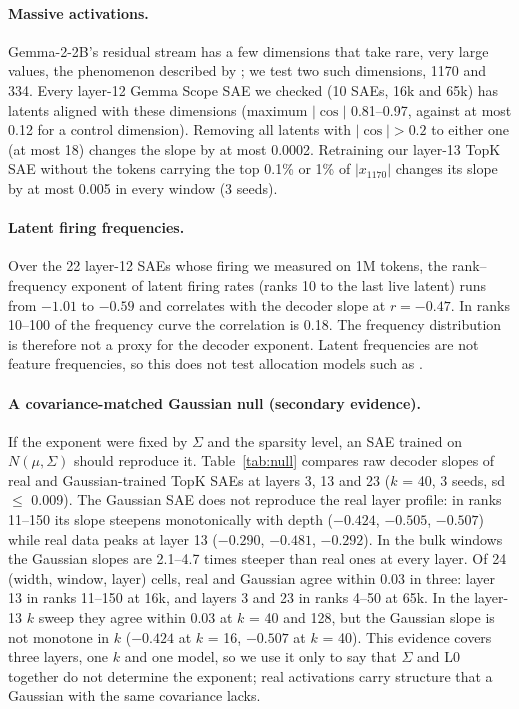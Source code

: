 \documentclass[10pt,twocolumn]{article}
\begin{document}
\paragraph{Massive activations.} Gemma-2-2B's residual stream has a few dimensions that take rare, very large values, the phenomenon described by \citet{sun2024massive}; we test two such dimensions, 1170 and 334. Every layer-12 Gemma Scope SAE we checked (10 SAEs, 16k and 65k) has latents aligned with these dimensions (maximum $|\cos|$ 0.81--0.97, against at most 0.12 for a control dimension). Removing all latents with $|\cos| > 0.2$ to either one (at most 18) changes the slope by at most 0.0002. Retraining our layer-13 TopK SAE without the tokens carrying the top 0.1\% or 1\% of $|x_{1170}|$ changes its slope by at most 0.005 in every window (3 seeds).

\paragraph{Latent firing frequencies.} Over the 22 layer-12 SAEs whose firing we measured on 1M tokens, the rank--frequency exponent of latent firing rates (ranks 10 to the last live latent) runs from $-1.01$ to $-0.59$ and correlates with the decoder slope at $r = -0.47$. In ranks 10--100 of the frequency curve the correlation is 0.18. The frequency distribution is therefore not a proxy for the decoder exponent. Latent frequencies are not feature frequencies, so this does not test allocation models such as \citet{michaud2025manifolds}.

\paragraph{A covariance-matched Gaussian null (secondary evidence).} If the exponent were fixed by $\Sigma$ and the sparsity level, an SAE trained on $N(\mu,\Sigma)$ should reproduce it. Table~\ref{tab:null} compares raw decoder slopes of real and Gaussian-trained TopK SAEs at layers 3, 13 and 23 ($k$ = 40, 3 seeds, sd $\le$ 0.009). The Gaussian SAE does not reproduce the real layer profile: in ranks 11--150 its slope steepens monotonically with depth ($-0.424$, $-0.505$, $-0.507$) while real data peaks at layer 13 ($-0.290$, $-0.481$, $-0.292$). In the bulk windows the Gaussian slopes are 2.1--4.7 times steeper than real ones at every layer. Of 24 (width, window, layer) cells, real and Gaussian agree within 0.03 in three: layer 13 in ranks 11--150 at 16k, and layers 3 and 23 in ranks 4--50 at 65k. In the layer-13 $k$ sweep they agree within 0.03 at $k$ = 40 and 128, but the Gaussian slope is not monotone in $k$ ($-0.424$ at $k$ = 16, $-0.507$ at $k$ = 40). This evidence covers three layers, one $k$ and one model, so we use it only to say that $\Sigma$ and L0 together do not determine the exponent; real activations carry structure that a Gaussian with the same covariance lacks.
\end{document}

